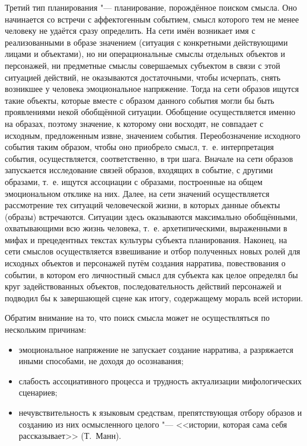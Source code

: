 \documentclass[a4paper, 12pt]{article}
\theoremstyle{plain}
\begin{document}
	Третий тип планирования "--- планирование, порождённое поиском смысла. Оно начинается со встречи с аффектогенным событием, смысл которого тем не менее человеку не удаётся сразу определить. На сети имён возникает имя с реализованными в образе значением (ситуация с конкретными действующими лицами и объектами), но ни операциональные смыслы отдельных объектов и персонажей, ни предметные смыслы совершаемых субъектом в связи с этой ситуацией действий, не оказываются достаточными, чтобы исчерпать, снять возникшее у человека эмоциональное напряжение. Тогда на сети образов ищутся такие объекты, которые вместе с образом данного события могли бы быть проявлениями некой обобщённой ситуации. Обобщение осуществляется именно на образах, поэтому значение, к которому они восходят, не совпадает с исходным, предложенным извне, значением события. Переобозначение исходного события таким образом, чтобы оно приобрело смысл, т.~е. интерпретация события, осуществляется, соответственно, в три шага. Вначале на сети образов запускается исследование связей образов, входящих в событие, с другими образами, т.~е. ищутся ассоциации с образами, построенные на общем эмоциональном отклике на них. Далее, на сети значений осуществляется рассмотрение тех ситуаций человеческой жизни, в которых данные объекты (образы) встречаются. Ситуации здесь оказываются максимально обобщёнными, охватывающими всю жизнь человека, т.~е. архетипическими, выраженными в мифах и прецедентных текстах культуры субъекта планирования. Наконец, на сети смыслов осуществляется взвешивание и отбор полученных новых ролей для исходных объектов и персонажей путём создания нарратива, повествования о событии, в котором его личностный смысл для субъекта как целое определял бы круг задействованных объектов, последовательность действий персонажей и подводил бы к завершающей сцене как итогу, содержащему мораль всей истории.
	
	Обратим внимание на то, что поиск смысла может не осуществляться по нескольким причинам: 
	\begin{itemize}
		\item эмоциональное напряжение не запускает создание нарратива, а разряжается иными способами, не доходя до осознавания;
		\item слабость ассоциативного процесса и трудность актуализации мифологических сценариев;
		\item нечувствительность к языковым средствам, препятствующая отбору образов и созданию из них осмысленного целого "--- <<истории, которая сама себя рассказывает>> (Т.~Манн).
	\end{itemize}
\end{document}
